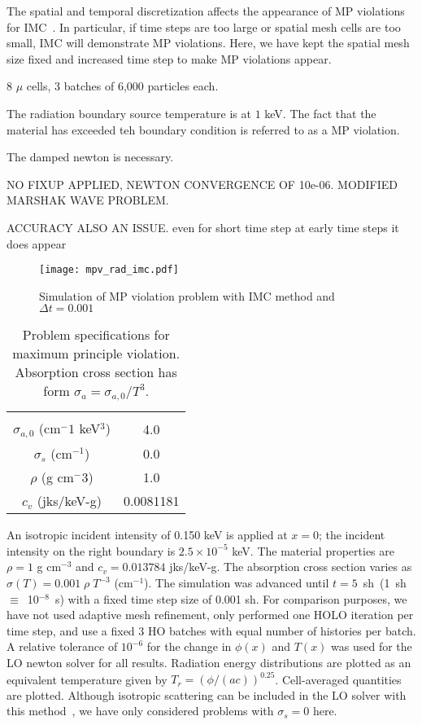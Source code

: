 The spatial and temporal discretization affects the appearance of MP violations for
IMC~\cite{wollaber2013discrete}. In particular, if time steps are too large or spatial
mesh cells are too small, IMC will demonstrate MP violations.  Here, we have kept the
spatial mesh size fixed and increased time step to make MP violations appear.

8 $\mu$ cells, 3 batches of 6,000 particles each.

The radiation boundary source temperature is at $1$ keV. The fact that the material
has exceeded teh boundary condition is referred to as a MP violation.


The damped newton is necessary.

NO FIXUP APPLIED, NEWTON CONVERGENCE OF 10e-06.  MODIFIED MARSHAK WAVE PROBLEM.

ACCURACY ALSO AN ISSUE.  even for short time step at early time steps it does appear

\begin{figure}[H]
    \centering
    \texttt{[image: mpv\_rad\_imc.pdf]}
    \caption{Simulation of MP violation problem with IMC method and $\Delta t = 0.001$}
\end{figure}





\begin{table}[H]
        \caption{\label{tab:mpv_prob}Problem specifications for maximum principle
        violation. Absorption cross section has form $\sigma_a = \sigma_{a,0}/T^3$.}
\centering
        \begin{tabular}{|c|c|} \hline \\
            $\sigma_{a,0}$ (cm$^-1$ keV$^3$)  & 4.0  \\
            $\sigma_s$ (cm$^{-1}$) & 0.0 \\
            $\rho$ (g cm$^-3$) & 1.0  \\
            $c_v$ (jks/keV-g) & 0.0081181  \\ 
        \end{tabular}
\end{table}



   An isotropic incident intensity of 0.150 keV is applied
at $x=0$; the incident intensity on the right boundary is $2.5\times10^{-5}$ keV.
The material properties are $\rho = 1$ g cm$^{-3}$ and $c_v = 0.013784$ jks/keV-g. The
absorption cross section varies as $\sigma(T) = 0.001\;\rho\; T^{-3}$ (cm$^{-1}$).
The simulation was advanced until $t=5$~sh~(1~sh~$\equiv$~10$^{-8}$~s) with a fixed time step size of 0.001 sh. For comparison purposes, we
have not used adaptive mesh
refinement, only performed one HOLO iteration per time
step, and use a fixed 3 HO batches with equal number of histories per batch. A
relative tolerance of $10^{-6}$ for the change in $\phi(x)$ and $T(x)$ was used for
the LO newton solver for all results. Radiation energy
distributions are plotted as an equivalent temperature given by
$T_r=(\phi/(ac))^{0.25}$.  Cell-averaged quantities are plotted.
Although isotropic scattering can be included in the LO solver with this method~\cite{ans_2014}, we have only
considered problems with $\sigma_s = 0$ here.  
